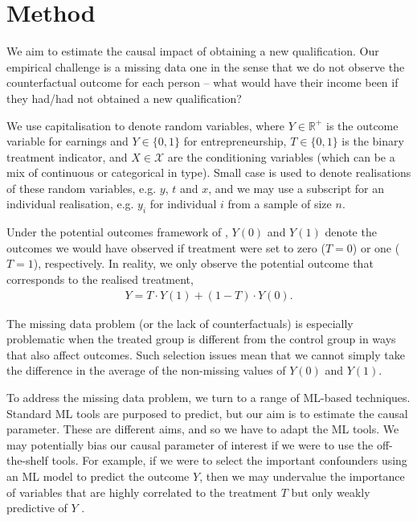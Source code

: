 \documentclass[12pt, a4paper]{article}
\begin{document}



\section{Method}

We aim to estimate the causal impact of obtaining a new qualification. Our empirical challenge is a missing data one in the sense that we do not observe the counterfactual outcome for each person -- what would have their income been if they had/had not obtained a new qualification?

We use capitalisation to denote random variables, where $Y \in \mathbb{R}^+$ is
the outcome variable for earnings and $Y \in \{0, 1\}$ for entrepreneurship, $T
\in \{0, 1\}$ is the binary treatment indicator, and $X \in \mathcal{X}$ are
the conditioning variables (which can be a mix of continuous or categorical in
type). Small case is used to denote realisations of these random variables,
e.g. $y$, $t$ and $x$, and we may use a subscript for an individual
realisation, e.g. $y_i$ for individual $i$ from a sample of size $n$.

Under the potential outcomes framework of \cite{imbens2015}, $Y(0)$ and $Y(1)$ denote the outcomes we would have observed if treatment were set to zero ($T=0$) or one ($T=1$), respectively. In reality, we only observe the potential outcome that corresponds to the realised treatment,
\begin{align}
Y = T \cdot Y(1) + (1-T) \cdot Y(0).
\end{align}

The missing data problem (or the lack of counterfactuals) is especially problematic when the treated group is different from the control group in ways that also affect outcomes. Such selection issues mean that we cannot simply take the difference in the average of the non-missing values of $Y(0)$ and $Y(1)$.

To address the missing data problem, we turn to a range of ML-based techniques.
Standard ML tools are purposed to predict, but our aim is to estimate the
causal parameter. These are different aims, and so we have to adapt the ML
tools. We may potentially bias our causal parameter of interest if we were to
use the off-the-shelf tools. For example, if we were to select the important
confounders using an ML model to predict the outcome $Y$, then we may
undervalue the importance of variables that are highly correlated to the
treatment $T$ but only weakly predictive of $Y$ \citep{cherno2018}.
\end{document}
